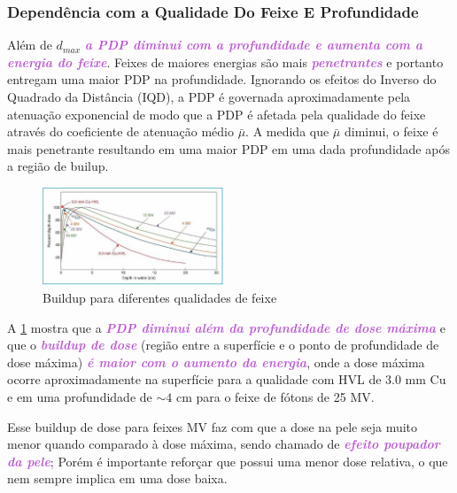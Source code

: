 \documentclass[11pt,a4paper]{article}
\begin{document}
\subsubsection*{Dependência com a Qualidade Do Feixe E Profundidade}

		
	Além de $d_{max}$ \textcolor{MediumOrchid}{\textbf{\textit{a PDP diminui com a profundidade e aumenta com a energia do feixe}}}. Feixes de maiores energias são mais \textcolor{MediumOrchid}{\textbf{\textit{penetrantes}}} e portanto entregam uma maior PDP na profundidade. Ignorando os efeitos do Inverso do Quadrado da Distância (IQD), a PDP é governada aproximadamente pela atenuação exponencial de modo que a PDP é afetada pela qualidade do feixe através do coeficiente de atenuação médio $\bar{\mu}$. A medida que $\bar{\mu}$ diminui, o feixe é mais penetrante resultando em uma maior PDP em uma dada profundidade após a região de builup. 

	\begin{figure}
		\centering
		\includegraphics[width=0.48\textwidth]{Imagens/buildupDiferentesFeixes.JPG}
		\caption{Buildup para diferentes qualidades de feixe}
		\label{fig:buildupDiferentesFeixes}
	\end{figure}


	A \ref{fig:buildupDiferentesFeixes} mostra que a \textcolor{MediumOrchid}{\textbf{\textit{PDP diminui além da profundidade de dose máxima}}} e que o \textcolor{MediumOrchid}{\textbf{\textit{buildup de dose }}}(região entre a superfície e o ponto de profundidade de dose máxima) \textcolor{MediumOrchid}{\textbf{\textit{é maior com o aumento da energia}}}, onde a dose máxima ocorre aproximadamente na superfície para a qualidade com HVL de 3.0 mm Cu e em uma profundidade de $\sim 4$ cm para o feixe de fótons de 25 MV.

	Esse buildup de dose para feixes MV faz com que a dose na pele seja muito menor quando comparado à dose máxima, sendo chamado de \textcolor{MediumOrchid}{\textbf{\textit{efeito poupador da pele}}}; Porém é importante reforçar que possui uma menor dose relativa, o que nem sempre implica em uma dose baixa.		
\end{document}

